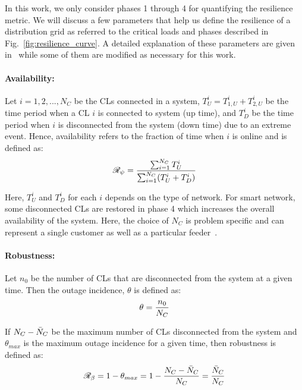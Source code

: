 \documentclass[hidelinks, 12pt]{article}
\begin{document}
In this work, we only consider phases 1 through 4 for quantifying the resilience metric. We will discuss a few parameters that help us define the resilience of a distribution grid as referred to the critical loads and phases described in Fig.~\ref{fig:resilience_curve}. A detailed explanation of these parameters are given in~\cite{2016} while some of them are modified as necessary for this work.

\paragraph*{Availability:}

Let $i = 1, 2, ... ,N_C$ be the CLs connected in a system, $T_U^i = T_{1,U}^i + T_{2,U}^i$ be the time period when a CL $i$ is connected to system (up time), and $T_D^i$ be the time period when $i$ is disconnected from the system (down time) due to an extreme event. Hence, availability refers to the fraction of time when $i$ is online and is defined as:
\vspace{-3pt}
\begin{equation} \small
    \mathcal{R}_\psi = \frac{\sum_{i=1}^{N_C} T_U^i}{\sum_{i=1}^{N_C} (T_U^i + T_D^i)}
    \label{eq:availability}
\end{equation}

\noindent
Here, $T_U^i$ and $T_D^i$ for each $i$ depends on the type of network. For smart network, some disconnected CLs are restored in phase 4 which increases the overall availability of the system. Here, the choice of $N_C$ is problem specific and can represent a single customer as well as a particular feeder~\cite{2016}.   

\paragraph*{Robustness:}

Let $n_0$ be the number of CLs that are disconnected from the system at a given time. Then the outage incidence, $\theta$ is defined as:
\vspace{-5pt}
\begin{equation} \small
    \theta = \frac{n_0}{N_C}
    \label{eq:max_incidence}
\end{equation}

\noindent
If $N_C - \Bar{N}_C$ be the maximum number of CLs disconnected from the system and $\theta_{max}$ is the maximum outage incidence for a given time, then robustness is defined as:
\vspace{-3pt}
\begin{equation} \small
    \mathcal{R}_\beta = 1 - \theta_{max} = 1 - \frac{N_C - \Bar{N}_C}{N_C} = \frac{\Bar{N}_C}{N_C}
    \label{eq:robustness}
\end{equation}
\end{document}
